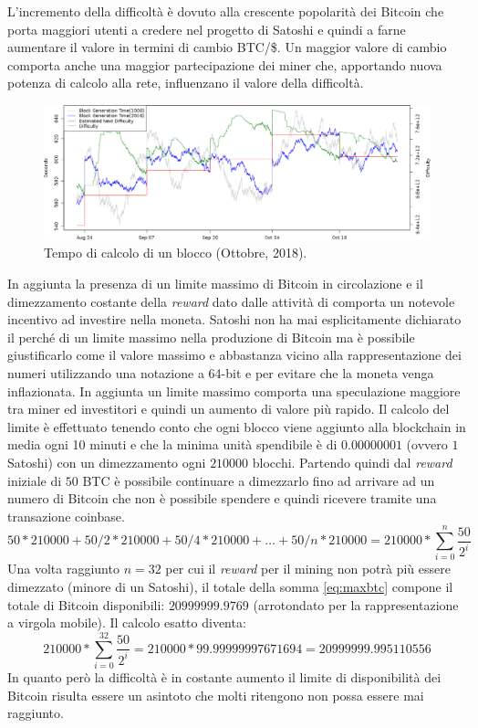 L'incremento della difficoltà è dovuto alla crescente popolarità dei Bitcoin che porta maggiori utenti a credere nel progetto di Satoshi e quindi a farne aumentare il valore in termini di cambio BTC/\$. Un maggior valore di cambio comporta anche una maggior partecipazione dei miner che, apportando nuova potenza di calcolo alla rete, influenzano il valore della difficoltà.
\begin{figure}
    \centering
    \includegraphics[width=\textwidth]{images/diffvsblock.png}
    \caption{Tempo di calcolo di un blocco (Ottobre, 2018).}
\end{figure}
In aggiunta la presenza di un limite massimo di Bitcoin in circolazione e il dimezzamento costante della \textit{reward} dato dalle attività di  comporta un notevole incentivo ad investire nella moneta. Satoshi non ha mai esplicitamente dichiarato il perché di un limite massimo nella produzione di Bitcoin ma è possibile giustificarlo come il valore massimo e abbastanza vicino alla rappresentazione dei numeri utilizzando una notazione a 64-bit e per evitare che la moneta venga inflazionata. In aggiunta un limite massimo comporta una speculazione maggiore tra miner ed investitori e quindi un aumento di valore più rapido.\newline
Il calcolo del limite è effettuato tenendo conto che ogni blocco viene aggiunto alla blockchain in media ogni 10 minuti e che la minima unità spendibile è di $0.00000001$ (ovvero $1$ Satoshi) con un dimezzamento ogni $210000$ blocchi. Partendo quindi dal \textit{reward} iniziale di $50$ BTC è possibile continuare a dimezzarlo fino ad arrivare ad un numero di Bitcoin che non è possibile spendere e quindi ricevere tramite una transazione coinbase.
\begin{equation}\label{eq:maxbtc}
    50 * 210000 + 50/2 * 210000 + 50/4 * 210000 + \dots + 50/n * 210000 = 210000 * \sum_{i=0}^{n} \frac{50}{2^{i}}
\end{equation}
Una volta raggiunto $n=32$ per cui il \textit{reward} per il mining non potrà più essere dimezzato (minore di un Satoshi), il totale della somma \ref{eq:maxbtc} compone il totale di Bitcoin disponibili: $20999999.9769$ (arrotondato per la rappresentazione a virgola mobile).
Il calcolo esatto diventa:
\begin{equation}
    210000 * \sum_{i=0}^{32} \frac{50}{2^{i}}  = 210000 * 99.99999997671694 = 20999999.995110556
\end{equation}
In quanto però la difficoltà è in costante aumento il limite di disponibilità dei Bitcoin risulta essere un asintoto che molti ritengono non possa essere mai raggiunto.

